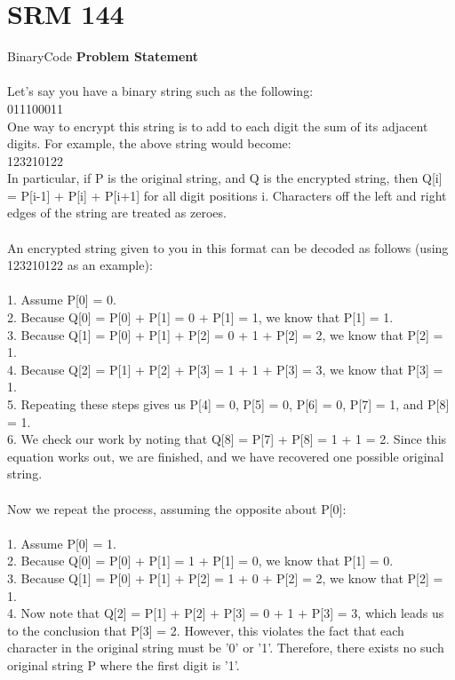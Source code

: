 \documentclass[a4j,10pt,oneside,openany]{jsbook}
\begin{document}
\section{SRM 144}
\begin{breakitembox}[l]{BinaryCode}
{\bf Problem Statement}\\\\
Let's say you have a binary string such as the following:\\
011100011\\
One way to encrypt this string is to add to each digit the sum of its adjacent digits. For example, the above string would become:\\
123210122\\
In particular, if P is the original string, and Q is the encrypted string, then Q[i] = P[i-1] + P[i] + P[i+1] for all digit positions i. Characters off the left and right edges of the string are treated as zeroes.\\\\
An encrypted string given to you in this format can be decoded as follows (using 123210122 as an example):\\\\
1. Assume P[0] = 0.\\
2. Because Q[0] = P[0] + P[1] = 0 + P[1] = 1, we know that P[1] = 1.\\
3. Because Q[1] = P[0] + P[1] + P[2] = 0 + 1 + P[2] = 2, we know that P[2] = 1.\\
4. Because Q[2] = P[1] + P[2] + P[3] = 1 + 1 + P[3] = 3, we know that P[3] = 1.\\
5. Repeating these steps gives us P[4] = 0, P[5] = 0, P[6] = 0, P[7] = 1, and P[8] = 1.\\
6. We check our work by noting that Q[8] = P[7] + P[8] = 1 + 1 = 2. Since this equation works out, we are finished, and we have recovered one possible original string.\\\\
Now we repeat the process, assuming the opposite about P[0]:\\\\
1. Assume P[0] = 1.\\
2. Because Q[0] = P[0] + P[1] = 1 + P[1] = 0, we know that P[1] = 0.\\
3. Because Q[1] = P[0] + P[1] + P[2] = 1 + 0 + P[2] = 2, we know that P[2] = 1.\\
4. Now note that Q[2] = P[1] + P[2] + P[3] = 0 + 1 + P[3] = 3, which leads us to the conclusion that P[3] = 2. However, this violates the fact that each character in the original string must be '0' or '1'. Therefore, there exists no such original string P where the first digit is '1'.\\

\end{breakitembox}
\end{document}
